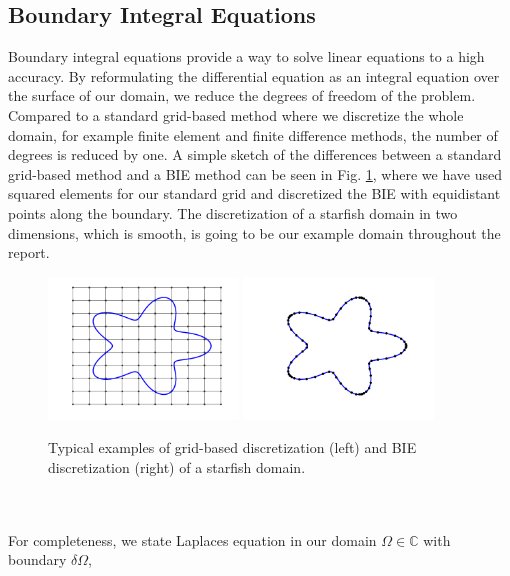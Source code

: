 \documentclass[a4paper,10pt]{article}
\begin{document}
\subsection*{Boundary Integral Equations}
Boundary integral equations provide a way to solve linear equations to a high accuracy. By reformulating the differential equation as an integral equation over the surface of our domain, we reduce the degrees of freedom of the problem. Compared to a standard grid-based method where we discretize the whole domain, for example finite element and finite difference methods, the number of degrees is reduced by one. A simple sketch of the differences between a standard grid-based method and a BIE method can be seen in Fig. \ref{fig:disc}, where we have used squared elements for our standard grid and discretized the BIE with equidistant points along the boundary. The discretization of a starfish domain in two dimensions, which is smooth, is going to be our example domain throughout the report. 
\begin{figure}[ht]
	\begin{center}
		\includegraphics[width=0.45\textwidth]{Graphics/starfish_grid.png}
		\includegraphics[width =0.45\textwidth]{Graphics/starfish_BIE.png}
	\end{center}
	\caption{Typical examples of grid-based discretization (left) and BIE discretization (right) of a starfish domain.}
	\label{fig:disc}
\end{figure}
\\ \\
For completeness, we state Laplaces equation in our domain $\Omega\in\mathbb{C}$ with boundary $\delta\Omega$,
\end{document}

